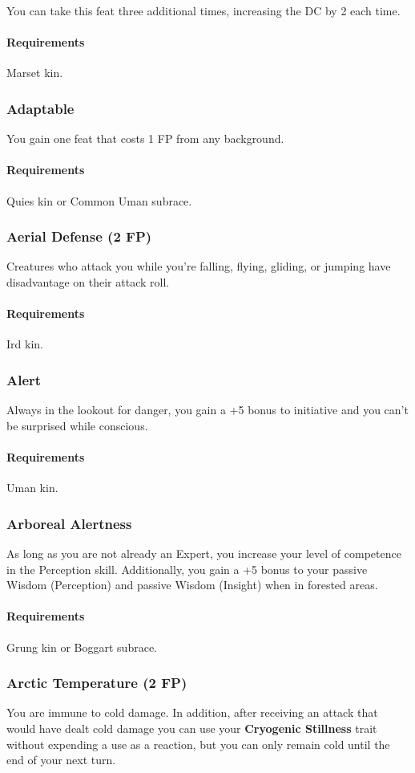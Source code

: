     You can take this feat three additional times, increasing the DC by 2 each time.
    \paragraph{Requirements} Marset kin.
\subsubsection{Adaptable} \label{feat::adaptable}
    You gain one feat that costs 1 FP from any background.
    \paragraph{Requirements} Quies kin or Common Uman subrace.
\subsubsection{Aerial Defense (2 FP)} \label{feat::aerialdefense}
    Creatures who attack you while you're falling, flying, gliding, or jumping have disadvantage on their attack roll.
    \paragraph{Requirements} Ird kin.
\subsubsection{Alert} \label{feat::alert}
    Always in the lookout for danger, you gain a +5 bonus to initiative and you can't be surprised while conscious.
    \paragraph{Requirements} Uman kin.
\subsubsection{Arboreal Alertness} \label{feat::arborealalertness}
    As long as you are not already an Expert, you increase your level of competence in the Perception skill.
    Additionally, you gain a +5 bonus to your passive Wisdom (Perception) and passive Wisdom (Insight) when in forested areas.
    \paragraph{Requirements} Grung kin or Boggart subrace.
\subsubsection{Arctic Temperature (2 FP)} \label{feat::arctictemperature}
    You are immune to cold damage.
    In addition, after receiving an attack that would have dealt cold damage you can use your \textbf{Cryogenic Stillness} trait without expending a use as a reaction, but you can only remain cold until the end of your next turn.
